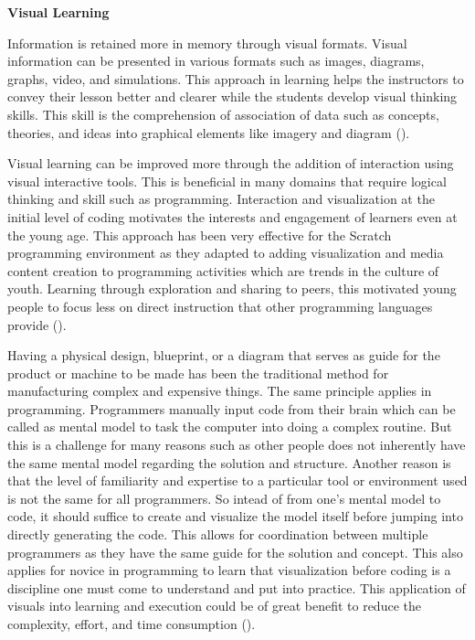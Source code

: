 \flushleft
\textbf{Visual Learning}\\
\justifying

\parx
Information is retained more in memory through visual formats.  Visual information can
be presented in various formats such as images, diagrams, graphs, video, and
simulations. This approach in learning helps the instructors to convey their lesson
better and clearer while the students develop visual thinking skills.  This skill is the
comprehension of association of data such as concepts, theories, and ideas into
graphical elements like imagery and diagram (\cite{raiyn_2020}).

\parx
Visual learning can be improved more through the addition of interaction using visual
interactive tools. This is beneficial in many domains that require logical thinking and
skill such as programming. Interaction and visualization at the initial level of coding
motivates the interests and engagement of learners even at the young age. This approach
has been very effective for the Scratch programming environment as they adapted to
adding visualization and media content creation to programming activities which are
trends in the culture of youth. Learning through exploration and sharing to peers, this
motivated young people to focus less on direct instruction that other programming
languages provide (\cite{maloney_resnick_rusk_silverman_eastmond_2010}).

\parx
Having a physical design, blueprint, or a diagram that serves as guide for the product
or machine to be made has been the traditional method for manufacturing complex and
expensive things. The same principle applies in programming. Programmers manually input
code from their brain which can be called as mental model to task the computer into
doing a complex routine. But this is a challenge for many reasons such as other people
does not inherently have the same mental model regarding the solution and structure.
Another reason is that the level of familiarity and expertise to a particular tool
or environment used is not the same for all programmers. So intead of from one's
mental model to code, it should suffice to create and visualize the model itself
before jumping into directly generating the code. This allows for coordination between
multiple programmers as they have the same guide for the solution and concept. This
also applies for novice in programming to learn that visualization before coding is
a discipline one must come to understand and put into practice. This application of
visuals into learning and execution could be of great benefit to reduce the complexity,
effort, and time consumption (\cite{ottosson_zaslavskyi_2019}).
